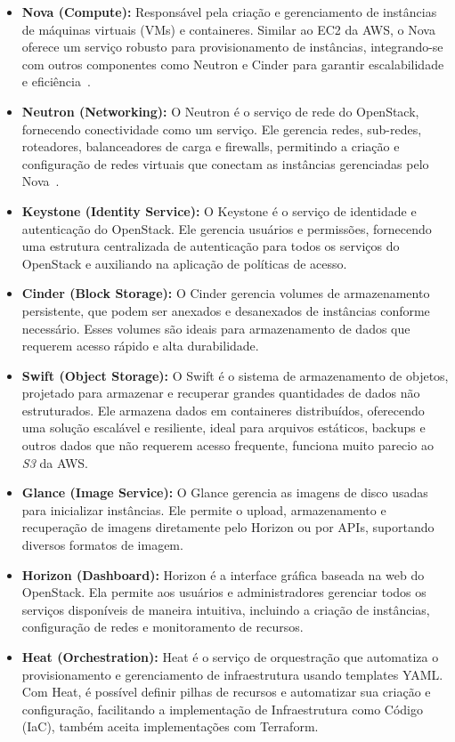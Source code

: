\begin{itemize}
    \item \textbf{Nova (Compute): } Responsável pela criação e gerenciamento de instâncias de máquinas virtuais (VMs) e containeres. Similar ao EC2 da AWS, o Nova oferece um serviço robusto para provisionamento de instâncias, integrando-se com outros componentes como Neutron e Cinder para garantir escalabilidade e eficiência~\citep{OpenStackNovaArchitecture}.
    \item \textbf{Neutron (Networking): } O Neutron é o serviço de rede do OpenStack, fornecendo conectividade como um serviço. Ele gerencia redes, sub-redes, roteadores, balanceadores de carga e firewalls, permitindo a criação e configuração de redes virtuais que conectam as instâncias gerenciadas pelo Nova~\citep{OpenStackNeutronArchitecture}.
    \item \textbf{Keystone (Identity Service): } O Keystone é o serviço de identidade e autenticação do OpenStack. Ele gerencia usuários e permissões, fornecendo uma estrutura centralizada de autenticação para todos os serviços do OpenStack e auxiliando na aplicação de políticas de acesso.
    \item \textbf{Cinder (Block Storage): } O Cinder gerencia volumes de armazenamento persistente, que podem ser anexados e desanexados de instâncias conforme necessário. Esses volumes são ideais para armazenamento de dados que requerem acesso rápido e alta durabilidade.
    \item \textbf{Swift (Object Storage): } O Swift é o sistema de armazenamento de objetos, projetado para armazenar e recuperar grandes quantidades de dados não estruturados. Ele armazena dados em containeres distribuídos, oferecendo uma solução escalável e resiliente, ideal para arquivos estáticos, backups e outros dados que não requerem acesso frequente, funciona muito parecio ao \textit{S3} da AWS.
    \item \textbf{Glance (Image Service): } O Glance gerencia as imagens de disco usadas para inicializar instâncias. Ele permite o upload, armazenamento e recuperação de imagens diretamente pelo Horizon ou por APIs, suportando diversos formatos de imagem.
    \item \textbf{Horizon (Dashboard): } Horizon é a interface gráfica baseada na web do OpenStack. Ela permite aos usuários e administradores gerenciar todos os serviços disponíveis de maneira intuitiva, incluindo a criação de instâncias, configuração de redes e monitoramento de recursos.
    \item \textbf{Heat (Orchestration): } Heat é o serviço de orquestração que automatiza o provisionamento e gerenciamento de infraestrutura usando templates YAML. Com Heat, é possível definir pilhas de recursos e automatizar sua criação e configuração, facilitando a implementação de Infraestrutura como Código (IaC), também aceita implementações com Terraform.

\end{itemize}
